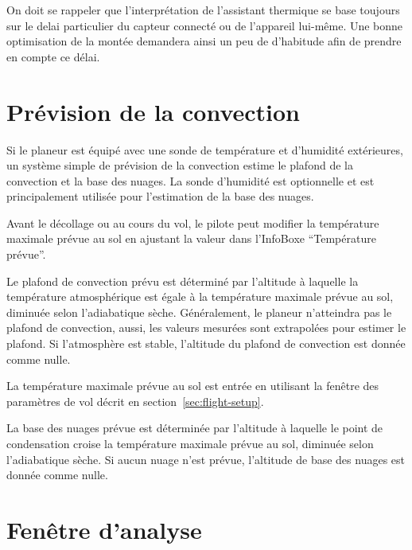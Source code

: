 On doit se rappeler que l'interprétation de l'assistant thermique se base toujours sur le delai particulier du capteur connecté ou de l'appareil lui-même.
Une bonne optimisation de la montée demandera ainsi un peu de d'habitude afin de prendre en compte ce délai.


\section{Prévision de la convection}\label{sec:convection-forecast}

Si le planeur est équipé avec une sonde de température et d'humidité extérieures, un système simple de prévision de la convection estime le plafond de la convection et la base des nuages.
La sonde d'humidité est optionnelle et est principalement utilisée pour l'estimation de la base des nuages.

Avant le décollage ou au cours du vol, le pilote peut modifier la température maximale prévue au sol en ajustant la valeur dans l'InfoBoxe ``Température prévue''.

Le plafond de convection prévu est déterminé par l'altitude à laquelle la température atmosphérique est égale à la température maximale prévue au sol, diminuée selon l'adiabatique sèche. %
Généralement, le planeur n'atteindra pas le plafond de convection, aussi, les valeurs mesurées sont extrapolées pour estimer le plafond.
Si l'atmosphère est stable, l'altitude du plafond de convection est donnée comme nulle.

La température maximale prévue au sol est entrée en utilisant la fenêtre des paramètres de vol décrit en section~\ref{sec:flight-setup}.


%

La base des nuages prévue est déterminée par l'altitude à laquelle le point de condensation croise la température maximale prévue au sol, diminuée selon l'adiabatique sèche. %
Si aucun nuage n'est prévue, l'altitude de base des nuages est donnée comme nulle.



\section{Fenêtre d'analyse}

